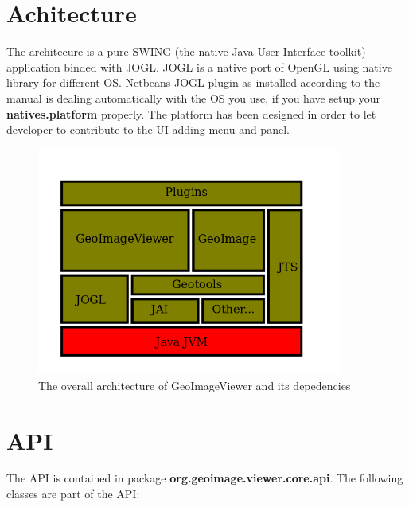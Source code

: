 \documentclass[12pt,a4paper,final,makeidx]{report}
\begin{document}
\section{Achitecture}
The architecure is a pure SWING (the native Java User Interface toolkit) application binded with JOGL.
JOGL is a native port of OpenGL using native library for different OS.
Netbeans JOGL plugin as installed according to the manual is dealing automatically with the OS you use, if you have setup your \textbf{natives.platform} properly. 
The platform has been designed in order to let developer to contribute to the UI adding menu and panel.

\begin{figure}
\begin{center}
\includegraphics[width=100mm]{./images/architecture.png}
\caption{The overall architecture of GeoImageViewer and its depedencies}
\end{center}
\end{figure}

\section{API}
The API is contained in package \textbf{org.geoimage.viewer.core.api}.
The following classes are part of the API:
\end{document}
